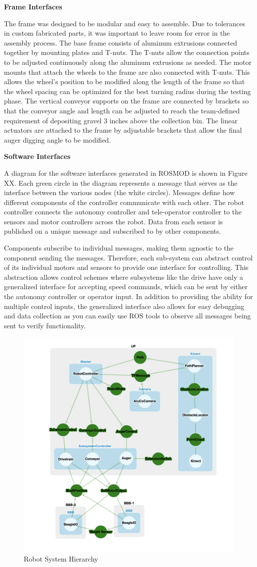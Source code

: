 \documentclass[class=article, crop=false]{standalone}
\begin{document}
	\textbf{Frame Interfaces}
	
	The frame was designed to be modular and easy to assemble. Due to tolerances in custom fabricated parts, it was important to leave room for error in the assembly process. The base frame consists of aluminum extrusions connected together by mounting plates and T-nuts. The T-nuts allow the connection points to be adjusted continuously along the aluminum extrusions as needed. The motor mounts that attach the wheels to the frame are also connected with T-nuts. This allows the wheel’s position to be modified along the length of the frame so that the wheel spacing can be optimized for the best turning radius during the testing phase. The vertical conveyor supports on the frame are connected by brackets so that the conveyor angle and length can be adjusted to reach the team-defined requirement of depositing gravel 3 inches above the collection bin. The linear actuators are attached to the frame by adjustable brackets that allow the final auger digging angle to be modified. 
	
		
	
	
	\textbf{Software Interfaces}
	
		A diagram for the software interfaces generated in ROSMOD is shown in Figure XX. Each green circle in the diagram represents a message that serves as the interface between the various nodes (the white circles). Messages define how different components of the controller communicate with each other. The robot controller connects the autonomy controller and tele-operator controller to the sensors and motor controllers across the robot. Data from each sensor is published on a unique message and subscribed to by other components. 
		
Components subscribe to individual messages, making them agnostic to the component sending the messages. Therefore, each sub-system can abstract control of its individual motors and sensors to provide one interface for controlling. This abstraction allows control schemes where subsystems like the drive have only a generalized interface for accepting speed commands, which can be sent by either the autonomy controller or operator input. In addition to providing the ability for multiple control inputs, the generalized interface also allows for easy debugging and data collection as you can easily use ROS tools to observe all messages being sent to verify functionality.

		\FloatBarrier
		\begin{figure}[h]
			\centering
			\includegraphics[width=0.5\linewidth]{09_Figures/programming_interfaces.png}
			\caption{Robot System Hierarchy}
			\label{fig:system_hierarchy}
		\end{figure}
		\FloatBarrier



	
	
\end{document}

